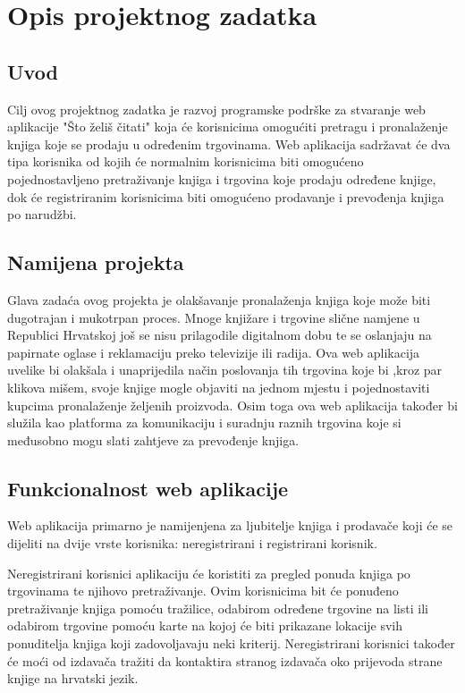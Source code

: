 \chapter{Opis projektnog zadatka}

	\section{Uvod}
	
		Cilj ovog projektnog zadatka je razvoj programske podrške za stvaranje web aplikacije "Što želiš čitati" koja će korisnicima omogućiti pretragu i pronalaženje knjiga koje se prodaju u određenim trgovinama. Web aplikacija sadržavat će dva tipa korisnika od kojih će normalnim korisnicima biti omogućeno pojednostavljeno pretraživanje knjiga i trgovina koje prodaju određene knjige, dok će registriranim korisnicima biti omogućeno prodavanje i prevođenja knjiga po narudžbi.
		
	\section{Namijena projekta}
	
		Glava zadaća ovog projekta je olakšavanje pronalaženja knjiga koje može biti dugotrajan i mukotrpan proces. Mnoge knjižare i trgovine slične namjene u Republici Hrvatskoj još se nisu prilagodile digitalnom dobu te se oslanjaju na papirnate oglase i reklamaciju preko televizije ili radija. Ova web aplikacija uvelike bi olakšala i unaprijedila način poslovanja tih trgovina koje bi ,kroz par klikova mišem, svoje knjige mogle objaviti na jednom mjestu i pojednostaviti kupcima pronalaženje željenih proizvoda. Osim toga ova web aplikacija također bi služila kao platforma za komunikaciju i suradnju raznih trgovina koje si međusobno mogu slati zahtjeve za prevođenje knjiga.
		
	\section{Funkcionalnost web aplikacije}
	
	Web aplikacija primarno je namijenjena za ljubitelje knjiga i prodavače koji će se dijeliti na dvije vrste korisnika: neregistrirani i registrirani korisnik.
	
	Neregistrirani korisnici aplikaciju će koristiti za pregled ponuda knjiga po trgovinama te njihovo pretraživanje. Ovim korisnicima bit će ponuđeno pretraživanje knjiga pomoću tražilice, odabirom određene trgovine na listi ili odabirom trgovine pomoću karte na kojoj će biti prikazane lokacije svih ponuditelja knjiga koji zadovoljavaju neki kriterij. Neregistrirani korisnici također će moći od izdavača tražiti da kontaktira stranog izdavača oko prijevoda strane knjige na hrvatski jezik.
	
